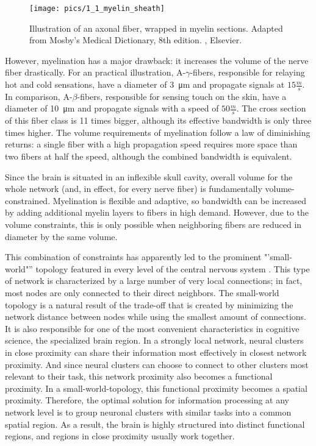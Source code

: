\begin{figure}[h]
\begin{center}
\vspace{7mm}
\texttt{[image: pics/1\_1\_myelin\_sheath]}
\caption{\label{1.1.neuron.illustrated} Illustration of an axonal fiber, wrapped in myelin sections. Adapted from Mosby's Medical Dictionary, 8th edition. , Elsevier.}
\end{center}
\end{figure}

However, myelination has a major drawback: it increases the volume of the nerve fiber drastically.
For an practical illustration, A-$\gamma$-fibers, responsible for relaying hot and cold sensations, have a diameter of \SI{3}{\um} and propagate signals at $15\frac{m}{s}$.
In comparison, A-$\beta$-fibers, responsible for sensing touch on the skin, have a diameter of \SI{10}{\um} and propagate signals with a speed of $50\frac{m}{s}$.
The cross section of this fiber class is 11 times bigger, although its effective bandwidth is only three times higher.
The volume requirements of myelination follow a law of diminishing returns: a single fiber with a high propagation speed requires more space than two fibers at half the speed, although the combined bandwidth is equivalent.

Since the brain is situated in an inflexible skull cavity, overall volume for the whole network (and, in effect, for every nerve fiber) is fundamentally volume-constrained.
Myelination is flexible and adaptive, so bandwidth can be increased by adding additional myelin layers to fibers in high demand.
However, due to the volume constraints, this is only possible when neighboring fibers are reduced in diameter by the same volume.

This combination of constraints has apparently led to the prominent "'small-world"'' topology featured in every level of the central nervous system \cite{1.1.smallWorld}.
This type of network is characterized by a large number of very local connections; in fact, most nodes are only connected to their direct neighbors.
The small-world topology is a natural result of the trade-off that is created by minimizing the network distance between nodes while using the smallest amount of connections.
It is also responsible for one of the most convenient characteristics in cognitive science, the specialized brain region.
In a strongly local network, neural clusters in close proximity can share their information most effectively in closest network proximity.
And since neural clusters can choose to connect to other clusters most relevant to their task, this network proximity also becomes a functional proximity.
In a small-world-topology, this functional proximity becomes a spatial proximity.
Therefore, the optimal solution for information processing at any network level is to group neuronal clusters with similar tasks into a common spatial region.
As a result, the brain is highly structured into distinct functional regions, and regions in close proximity usually work together.

